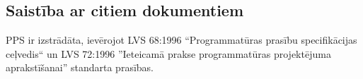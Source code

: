 \subsection*{Saistība ar citiem dokumentiem}
PPS ir izstrādāta, ievērojot LVS 68:1996 “Programmatūras prasību specifikācijas
ceļvedis`` un LVS 72:1996 ''Ieteicamā prakse programmatūras projektējuma
aprakstīšanai” standarta prasības.
